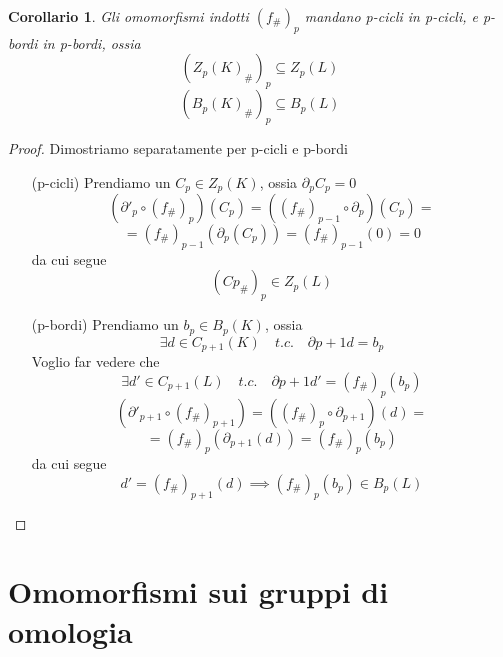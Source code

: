 \documentclass[a4paper]{report}
\newtheorem{corollary}{Corollario}
\newcommand{\shrp}[1]{\ensuremath{({#1}_\#)_p}}
\begin{document}
\begin{corollary}
    Gli omomorfismi indotti $\shrp{f}$ mandano p-cicli in p-cicli, e p-bordi in p-bordi, ossia
    \[
        \shrp{Z_p(K)}\subseteq Z_p(L)
    \]
    \[
        \shrp{B_p(K)}\subseteq B_p(L)
    \]
\end{corollary}
\begin{proof}
    Dimostriamo separatamente per p-cicli e p-bordi
    \begin{itemize}
        \item[(p-cicli)] Prendiamo un $C_p\in Z_p(K)$, ossia $\partial_pC_p=0$
            \[
                \left(\partial'_p\circ\shrp{f}\right)(C_p)=\left((f_\#)_{p-1}\circ\partial_p\right)(C_p)=
            \]
            \[
                =(f_\#)_{p-1}(\partial_p(C_p))=(f_\#)_{p-1}(0)=0
            \]
            da cui segue
            \[
                \shrp{Cp}\in Z_p(L)
            \]
        \item[(p-bordi)] Prendiamo un $b_p\in B_p(K)$, ossia
            \[
                \exists d\in C_{p+1}(K)\quad t.c.\quad \partial{p+1}d=b_p
            \]
            Voglio far vedere che
            \[
                \exists d'\in C_{p+1}(L)\quad t.c.\quad \partial{p+1}d'=\shrp{f}(b_p)
            \]
            \[
                \left(\partial'_{p+1}\circ(f_\#)_{p+1}\right)=\left(\shrp{f}\circ\partial_{p+1}\right)(d)=
            \]
            \[
                =\shrp{f}(\partial_{p+1}(d))=\shrp{f}(b_p)
            \]
            da cui segue
            \[
                d'=(f_\#)_{p+1}(d)\implies (f_\#)_p(b_p)\in B_p(L)
            \]
    \end{itemize}
\end{proof}
\newpage
\chapter{Omomorfismi sui gruppi di omologia}
\end{document}
